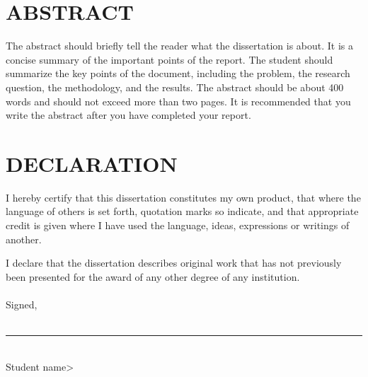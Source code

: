 \chapter*{ABSTRACT}

The abstract should briefly tell the reader what the dissertation is about. It is a concise summary of the important points of the report.  The student should summarize the key points of the document, including the problem, the research question, the methodology, and the results.  The abstract should be about 400 words and should not exceed more than two pages.  It is recommended that you write the abstract after you have completed your report.

\chapter*{DECLARATION}

I hereby certify that this dissertation constitutes my own product, that where the language of others is set forth, quotation marks so indicate, and that appropriate credit is given where I have used the language, ideas, expressions or writings of another.

I declare that the dissertation describes original work that has not previously been presented for the award of any other degree of any institution.\\
\quad\\

Signed,\\
\quad\\
\indent\rule{2.5in}{.5pt}\\
\indent{\textless}Student name{\textgreater}
